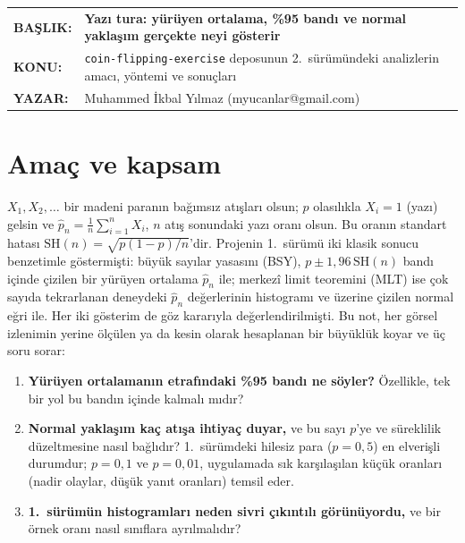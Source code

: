 \documentclass[11pt,a4paper]{article}
\begin{document}
\vspace*{14pt}
\begin{tabular}{@{}p{2.35cm}@{}p{\dimexpr\textwidth-2.35cm}@{}}
\textbf{BAŞLIK:} & \textbf{\large Yazı tura: yürüyen ortalama, \%95 bandı ve normal yaklaşım gerçekte neyi gösterir}\\[3pt]
\textbf{KONU:} & \texttt{coin-flipping-exercise} deposunun 2.\ sürümündeki analizlerin amacı, yöntemi ve sonuçları\\[3pt]
\textbf{YAZAR:} & Muhammed İkbal Yılmaz (myucanlar@gmail.com)
\end{tabular}

\vspace{8pt}
\vspace{12pt}

\section{Amaç ve kapsam}

$X_1, X_2, \dots$ bir madeni paranın bağımsız atışları olsun; $p$ olasılıkla $X_i = 1$ (yazı) gelsin ve
$\hat p_n = \frac1n\sum_{i=1}^n X_i$, $n$ atış sonundaki yazı oranı olsun. Bu oranın standart hatası
$\mathrm{SH}(n) = \sqrt{p(1-p)/n}$'dir. Projenin 1.\ sürümü iki klasik sonucu benzetimle göstermişti: büyük sayılar yasasını
(BSY), $p \pm 1{,}96\,\mathrm{SH}(n)$ bandı içinde çizilen bir yürüyen ortalama $\hat p_n$ ile; merkezî limit teoremini (MLT)
ise çok sayıda tekrarlanan deneydeki $\hat p_n$ değerlerinin histogramı ve üzerine çizilen normal eğri ile. Her iki gösterim de
göz kararıyla değerlendirilmişti. Bu not, her görsel izlenimin yerine ölçülen ya da kesin olarak hesaplanan bir büyüklük
koyar ve üç soru sorar:

\begin{enumerate}
  \item \textbf{Yürüyen ortalamanın etrafındaki \%95 bandı ne söyler?} Özellikle, tek bir yol bu bandın içinde kalmalı mıdır?
  \item \textbf{Normal yaklaşım kaç atışa ihtiyaç duyar,} ve bu sayı $p$'ye ve süreklilik düzeltmesine nasıl bağlıdır? 1.\
  sürümdeki hilesiz para ($p = 0{,}5$) en elverişli durumdur; $p = 0{,}1$ ve $p = 0{,}01$, uygulamada sık karşılaşılan küçük
  oranları (nadir olaylar, düşük yanıt oranları) temsil eder.
  \item \textbf{1.\ sürümün histogramları neden sivri çıkıntılı görünüyordu,} ve bir örnek oranı nasıl sınıflara ayrılmalıdır?
\end{enumerate}
\end{document}
